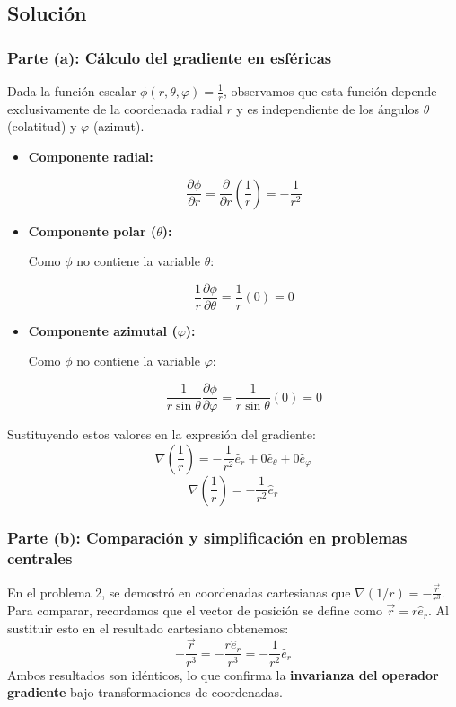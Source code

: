 \documentclass[12pt, letterpaper]{article}
\begin{document}
\subsection{Solución}

\subsubsection*{Parte (a): Cálculo del gradiente en esféricas}

Dada la función escalar $\phi(r, \theta, \varphi) = \frac{1}{r}$, observamos que esta función depende exclusivamente de la coordenada radial $r$ y es independiente de los ángulos $\theta$ (colatitud) y $\varphi$ (azimut).

\begin{itemize}
    \item \textbf{Componente radial:}
    
    $$ \frac{\partial \phi}{\partial r} = \frac{\partial}{\partial r} \left( \frac{1}{r} \right) = -\frac{1}{r^2} $$

    \item \textbf{Componente polar ($\theta$):}
    
    Como $\phi$ no contiene la variable $\theta$:
    
    $$ \frac{1}{r} \frac{\partial \phi}{\partial \theta} = \frac{1}{r} (0) = 0 $$

    \item \textbf{Componente azimutal ($\varphi$):}
    
    Como $\phi$ no contiene la variable $\varphi$:
    
    $$ \frac{1}{r \sin \theta} \frac{\partial \phi}{\partial \varphi} = \frac{1}{r \sin \theta} (0) = 0 $$
\end{itemize}

Sustituyendo estos valores en la expresión del gradiente:
$$ \nabla \left( \frac{1}{r} \right) = -\frac{1}{r^2} \hat{e}_r + 0 \hat{e}_\theta + 0 \hat{e}_\varphi $$
$$ \nabla \left( \frac{1}{r} \right) = -\frac{1}{r^2} \hat{e}_r $$

\subsubsection*{Parte (b): Comparación y simplificación en problemas centrales}

En el problema 2, se demostró en coordenadas cartesianas que $\nabla (1/r) = -\frac{\vec{r}}{r^3}$. 
Para comparar, recordamos que el vector de posición se define como $\vec{r} = r \hat{e}_r$. Al sustituir esto en el resultado cartesiano obtenemos:
$$ -\frac{\vec{r}}{r^3} = -\frac{r \hat{e}_r}{r^3} = -\frac{1}{r^2} \hat{e}_r $$
Ambos resultados son idénticos, lo que confirma la \textbf{invarianza del operador gradiente} bajo transformaciones de coordenadas.
\end{document}
